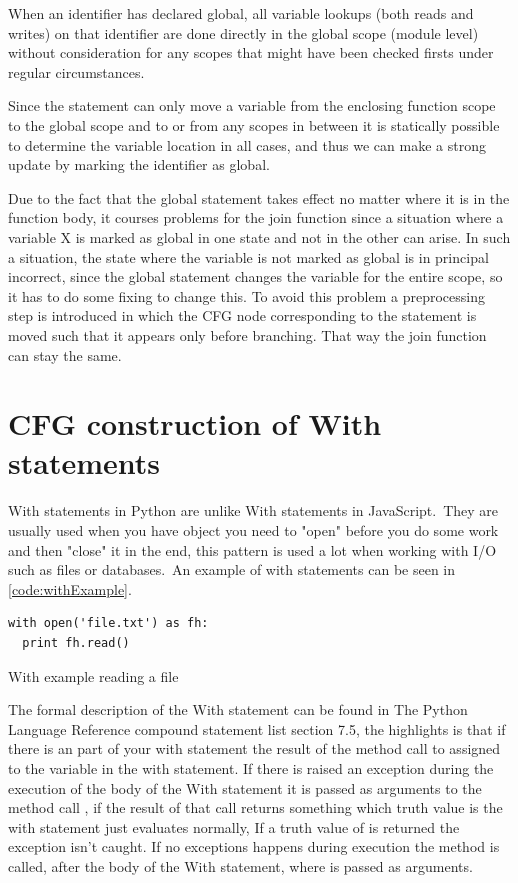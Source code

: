 When an identifier has declared global, all variable lookups (both reads and writes) on that identifier are done directly in the global scope (module level) without consideration for any scopes that might have been checked firsts under regular circumstances.

Since the  statement can only move a variable from the enclosing function scope to the global scope and to or from any scopes in between it is statically possible to determine the variable location in all cases, and thus we can make a strong update by marking the identifier as global. 

Due to the fact that the global statement takes effect no matter where it is in the function body, it courses problems for the join function since a situation where a variable X is marked as global in one state and not in the other can arise. In such a situation, the state where the variable is not marked as global is in principal incorrect, since the global statement changes the variable for the entire scope, so it has to do some fixing to change this. To avoid this problem a preprocessing step is introduced in which the CFG node corresponding to the  statement is moved such that it appears only before branching. That way the join function can stay the same.



\section{CFG construction of With statements}
With statements in Python are unlike With statements in JavaScript.\ They are usually used when you have object you need to "open" before you do some work and then "close" it in the end, this pattern is used a lot when working with I/O such as files or databases.\ An example of with statements can be seen in \autoref{code:withExample}.

\begin{listing}[H]
  \begin{verbatim}
with open('file.txt') as fh:
  print fh.read()
  \end{verbatim}
  \caption{With example reading a file}\label{code:withExample}
\end{listing}

The formal description of the With statement can be found in The Python Language Reference compound statement list\cite{pyref.compound} section 7.5, 
the highlights is that if there is an  part of your with statement the result of the method call to  
assigned to the variable in the with statement. If there is raised an exception during the execution of the body of the With statement it is 
passed as arguments to the method call , if the result of that call returns something which truth value is  
the with statement just evaluates normally, If a truth value of  is returned the exception isn't caught. 
If no exceptions happens during execution the  method is called, after the body of the With statement, 
where  is passed as arguments.